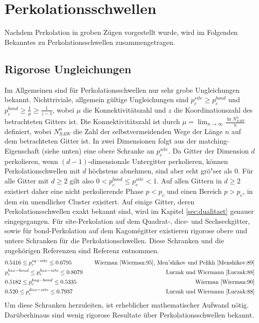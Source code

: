 \section{Perkolationsschwellen}

Nachdem Perkolation in groben Z\"ugen vorgestellt wurde, wird im Folgenden Bekanntes zu Perkolationsschwellen zusammengetragen. 

\subsection{Rigorose Ungleichungen}
Im Allgemeinen sind f\"ur Perkolationsschwellen nur sehr grobe Ungleichungen bekannt. Nichttriviale, allgemein g\"ultige Ungleichungen sind $p_c^{site}\geq p_c^{bond}$ und $p_c^{bond}\geq \frac{1}{\mu} \geq \frac{1}{z-1}$, wobei $\mu$ die Konnektivit\"atszahl und $z$ die Koordinationszahl des betrachteten Gitters ist. Die Konnektivit\"atszahl ist durch $\mu=\lim_{n\rightarrow \infty}\frac{\ln N_{SAW}^n}{n}$ definiert, wobei $N_{SAW}^n$ die Zahl der selbstvermeidenden Wege der L\"ange $n$ auf dem betrachteten Gitter ist. In zwei Dimensionen folgt aus der matching-Eigenschaft (siehe unten) eine obere Schranke an $p_c^{site}$. Da Gitter der Dimension $d$ perkolieren, wenn $(d-1)$-dimensionale Untergitter perkolieren, k\"onnen Perkolationschwellen mit $d$ h\"ochstens abnehmen, sind aber echt gr\"o"ser als $0$. F\"ur alle Gitter mit $d \geq 2$ gilt also $0 < p_c^{bond} \leq p_c^{site}<1$. Auf allen Gittern in $d\geq 2$ existiert daher eine nicht perkolierende Phase $p<p_c$ und einen Bereich $p>p_c$, in dem ein unendlicher Cluster exisitert. Auf einige Gitter, deren Perkolationsschwellen exakt bekannt sind, wird im Kapitel \ref{sec:dualitaet} genauer eingegegangen. F\"ur site-Perkolation auf dem Quadrat-, dice- und Sechseckgitter, sowie f\"ur bond-Perkolation auf dem Kagom\'egitter existieren rigorose obere und untere Schranken f\"ur die Perkolationschwellen. Diese Schranken und die zugeh\"origen Referenzen sind Referenz \cite{Hughes:96} entnommen. 
\begin{eqnarray}
& 0.5416\leq p_c^{sq-site}\leq0.6795 & \quad \text{Wierman \cite{Wierman:95}, Men'shikov und Pelikh \cite{Menshikov:89}}\\
& p_c^{hex-bond}\leq p_c^{hex-site}\leq 0.8079  &\quad \text{Luczak und Wiermann \cite{Luczak:88}}\\
& 0.5182 \leq p_c^{kag-bond}\leq 0.5335 & \quad \text{Wierman \cite{Wierman:90}}\\
& 0.520 \leq p_c^{dice-site}\leq 0.7937 &\quad \text{Luczak und Wiermann \cite{Luczak:88}}
\end{eqnarray}
Um diese Schranken herzuleiten, ist erheblicher mathematischer Aufwand n\"otig. Dar\"uberhinaus sind wenig rigorose Resultate \"uber Perkolationsschwellen bekannt.  


